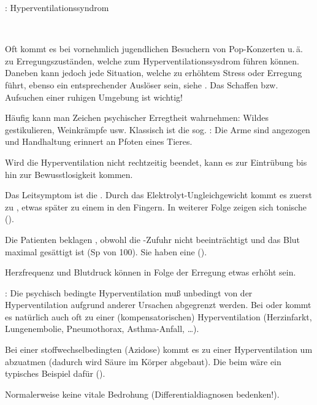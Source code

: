 \TextSlide
{\TxABCDE: Hyperventilationssyndrom}
{~
\begin{ABCDEText}
  \item[\ABCDE{1}] Oft kommt es bei vornehmlich
  jugendlichen Besuchern von Pop-Konzerten u.\,ä. zu
  Erregungszuständen, welche zum Hyperventilationssysdrom
  führen können. Daneben kann jedoch jede Situation, welche
  zu erhöhtem Stress oder Erregung führt, ebenso ein
  entsprechender Auslöser sein, 
  siehe . Das Schaffen bzw. Aufsuchen einer ruhigen
  Umgebung ist wichtig!
  \item[\ABCDE{2}] Häufig kann man Zeichen psychischer
  Erregtheit wahrnehmen: Wildes gestikulieren, Weinkrämpfe
  usw.
  Klassisch ist die sog. :
  Die Arme sind angezogen und Handhaltung erinnert an Pfoten eines Tieres.
  \item[\ABCDE{3}] Wird die Hyperventilation nicht
  rechtzeitig beendet, kann es zur Eintrübung bis hin zur Bewusstlosigkeit kommen.
  \item[\ABCDE{4}] Das Leitsymptom ist die .
  Durch
  das Elektrolyt-Ungleichgewicht kommt es zuerst zu
  , etwas später zu einem
   in den
  Fingern. In weiterer Folge zeigen sich tonische 
  ().
  \item[\ABCDE{B}]  Die Patienten beklagen , obwohl die
  -Zufuhr nicht beeinträchtigt und das Blut maximal
  gesättigt ist (Sp von 100\PC*). Sie haben eine
   ().
  \item[\ABCDE{C}] Herzfrequenz und Blutdruck können in
  Folge der Erregung etwas erhöht sein.
  \item[\ABCDE{E}] : Die psychisch bedingte
  Hyperventilation muß unbedingt von der Hyperventilation 
  aufgrund anderer Ursachen abgegrenzt
  werden. Bei  oder  kommt es natürlich auch
  oft zu einer (kompensatorischen) Hyperventilation
  (Herzinfarkt, Lungenembolie, Pneumothorax, Asthma-Anfall,
  \ldots).
  
  Bei einer stoffwechselbedingten  (Azidose)
  kommt es zu einer Hyperventilation um  abzuatmen
  (dadurch wird Säure im Körper abgebaut). Die
   beim  wäre
  ein typisches Beispiel dafür
  ().
  \item[\ABCDE{=}] Normalerweise keine vitale Bedrohung
  (Differentialdiagnosen bedenken!).
\end{ABCDEText}
}
